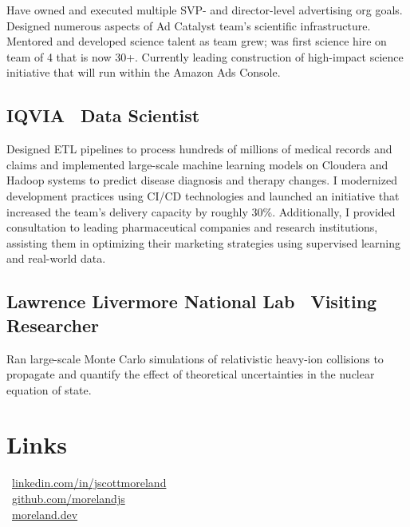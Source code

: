 \documentclass[letterpaper,10pt]{article}
\begin{document}
\begin{multicols}{2}
Have owned and executed multiple SVP- and director-level advertising org goals.
Designed numerous aspects of Ad Catalyst team's scientific infrastructure.
Mentored and developed science talent as team grew; was first science hire on
team of 4 that is now 30+.
Currently leading construction of high-impact science initiative that will
run within the Amazon Ads Console.


\subsection{IQVIA \textbar\ Data Scientist}
\smallskip

Designed ETL pipelines to process hundreds of millions of medical records and
claims and implemented large-scale machine learning models on Cloudera and Hadoop
systems to predict disease diagnosis and therapy changes.
I modernized development practices using CI/CD technologies and launched an
initiative that increased the team’s delivery capacity by roughly 30\%.
Additionally, I provided consultation to leading pharmaceutical companies and
research institutions, assisting them in optimizing their marketing strategies
using supervised learning and real-world data.

\subsection{Lawrence Livermore National Lab \textbar\ Visiting Researcher}
\smallskip

Ran large-scale Monte Carlo simulations of relativistic heavy-ion collisions to
propagate and quantify the effect of theoretical uncertainties in the
nuclear equation of state.

\section{Links}

 \textbar\ \href{https://www.linkedin.com/in/jscottmoreland}{linkedin.com/in/jscottmoreland}\\[1ex]
 \textbar\ \href{https://github.com/morelandjs}{github.com/morelandjs}\\[1ex]
 \textbar\ \href{https://moreland.dev}{moreland.dev}\\

\end{multicols}
\end{document}
